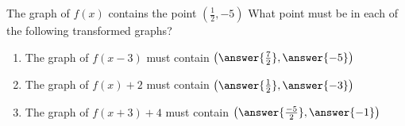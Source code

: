 \documentclass{ximera}
\author{David Kish}
\begin{document}
\begin{exercise}
The graph of $f(x)$ contains the point $(\frac{1}{2},-5)$ What point must be in each of the following transformed graphs?
\begin{enumerate}
\item The graph of $f(x-3)$ must contain $\left(\answer{\frac{7}{2}},\answer{-5}\right)$
\item The graph of $f(x)+2$ must contain $\left(\answer{\frac{1}{2}},\answer{-3}\right)$
\item The graph of $f(x+3)+4$ must contain $\left(\answer{\frac{-5}{2}},\answer{-1}\right)$
\end{enumerate}
\end{exercise}
\end{document}
